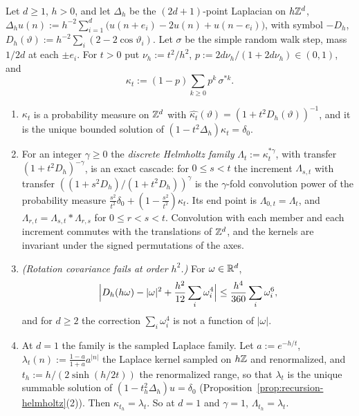\begin{proposition}
\label{prop:discrete-helmholtz}

Let $d \ge 1$, $h > 0$, and let $\Delta_h$ be the $(2d+1)$-point Laplacian on $h\mathbb{Z}^d$,
$\Delta_hu(n) := h^{-2}\sum_{i=1}^d\bigl(u(n+e_i) - 2u(n) + u(n-e_i)\bigr)$, with symbol $-D_h$,
$D_h(\vartheta) := h^{-2}\sum_i(2 - 2\cos\vartheta_i)$. Let $\sigma$ be the simple random walk step,
mass $1/2d$ at each $\pm e_i$. For $t > 0$ put $\nu_h := t^2/h^2$,
$p := 2d\nu_h/(1+2d\nu_h) \in (0,1)$, and
\[
  \kappa_t := (1-p)\sum_{k \ge 0}p^k\,\sigma^{*k} .
\]
\begin{enumerate}
\item $\kappa_t$ is a probability measure on $\mathbb{Z}^d$ with
$\widehat{\kappa_t}(\vartheta) = (1 + t^2D_h(\vartheta))^{-1}$, and it is the unique bounded
solution of $(1 - t^2\Delta_h)\kappa_t = \delta_0$.
\item For an integer $\gamma \ge 0$ the \emph{discrete Helmholtz family}
$\Lambda_t := \kappa_t^{*\gamma}$, with transfer $(1 + t^2D_h)^{-\gamma}$, is an exact cascade: for
$0 \le s < t$ the increment $\Lambda_{s,t}$ with transfer $((1 + s^2D_h)/(1 + t^2D_h))^{\gamma}$ is the
$\gamma$-fold convolution power of the probability measure
$\tfrac{s^2}{t^2}\delta_0 + (1 - \tfrac{s^2}{t^2})\kappa_t$. Its end point is
$\Lambda_{0,t} = \Lambda_t$, and $\Lambda_{r,t} = \Lambda_{s,t} * \Lambda_{r,s}$ for
$0 \le r < s < t$. Convolution with each
member and each increment commutes with the translations of $\mathbb{Z}^d$, and the kernels are invariant
under the signed permutations of the axes.
\item \emph{(Rotation covariance fails at order $h^2$.)} For $\omega \in \mathbb{R}^d$,
\[
  \Bigl|D_h(h\omega) - |\omega|^2 + \frac{h^2}{12}\sum_i\omega_i^4\Bigr|
  \le \frac{h^4}{360}\sum_i\omega_i^6 ,
\]
and for $d \ge 2$ the correction $\sum_i\omega_i^4$ is not a function of $|\omega|$.
\item At $d = 1$ the family is the sampled Laplace family. Let $a := e^{-h/t}$,
$\lambda_t(n) := \tfrac{1-a}{1+a}a^{|n|}$ the Laplace kernel sampled on $h\mathbb{Z}$ and renormalized,
and $t_h := h/(2\sinh(h/2t))$ the renormalized range, so that $\lambda_t$ is the unique summable
solution of $(1 - t_h^2\Delta_h)u = \delta_0$ (Proposition~\ref{prop:recursion-helmholtz}(2)). Then
$\kappa_{t_h} = \lambda_t$. So at $d = 1$ and $\gamma = 1$, $\Lambda_{t_h} = \lambda_t$.
\end{enumerate}
\end{proposition}

